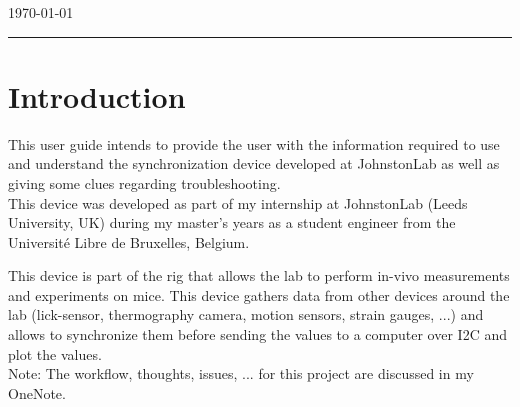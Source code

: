 \documentclass[a4paper]{article}
\begin{document}
\begin{titlepage}


{\large \today}\\[2cm] %


\vfill %

\end{titlepage}


\noindent\rule{\textwidth}{1pt}

\tableofcontents

\newpage

\listoffigures

\newpage



\section{Introduction}
This user guide intends to provide the user with the information required to use and understand the synchronization device developed at JohnstonLab as well as giving some clues regarding troubleshooting.\\

This device was developed as part of my internship at JohnstonLab (Leeds University, UK) during my master's years as a student engineer from the Université Libre de Bruxelles, Belgium.

This device is part of the rig that allows the lab to perform in-vivo measurements and experiments on mice. This device gathers data from other devices around the lab (lick-sensor, thermography camera, motion sensors, strain gauges, ...) and allows to synchronize them before sending the values to a computer over I2C and plot the values.\\

Note: The workflow, thoughts, issues, ... for this project are discussed in my OneNote.\\
\end{document}
